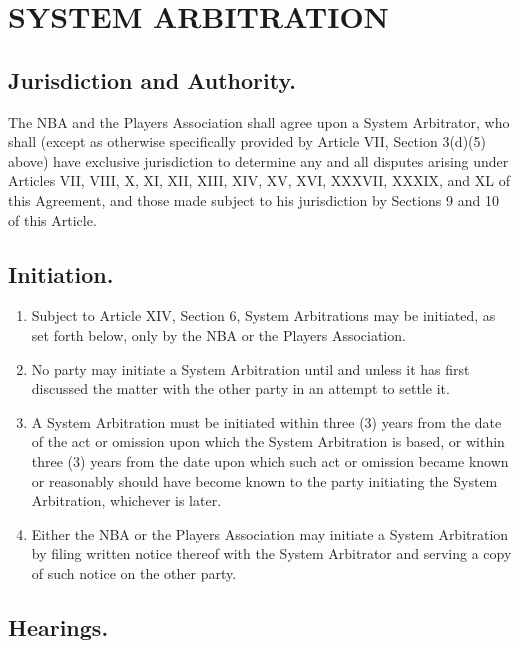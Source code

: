 \documentclass[
]{book}
\providecommand{\tightlist}{%
  \setlength{\itemsep}{0pt}\setlength{\parskip}{0pt}}
\begin{document}
\hypertarget{system-arbitration}{%
\chapter{SYSTEM ARBITRATION}\label{system-arbitration}}

\hypertarget{jurisdiction-and-authority.}{%
\section{Jurisdiction and Authority.}\label{jurisdiction-and-authority.}}

The NBA and the Players Association shall agree upon a System Arbitrator, who shall (except as otherwise specifically provided by Article VII, Section 3(d)(5) above) have exclusive jurisdiction to determine any and all disputes arising under Articles VII, VIII, X, XI, XII, XIII, XIV, XV, XVI, XXXVII, XXXIX, and XL of this Agreement, and those made subject to his jurisdiction by Sections 9 and 10 of this Article.

\hypertarget{initiation.-1}{%
\section{Initiation.}\label{initiation.-1}}

\begin{enumerate}
\def\labelenumi{(\alph{enumi})}
\tightlist
\item
  Subject to Article XIV, Section 6, System Arbitrations may be initiated, as set forth below, only by the NBA or the Players Association.
\item
  No party may initiate a System Arbitration until and unless it has first discussed the matter with the other party in an attempt to settle it.
\item
  A System Arbitration must be initiated within three (3) years from the date of the act or omission upon which the System Arbitration is based, or within three (3) years from the date upon which such act or omission became known or reasonably should have become known to the party initiating the System Arbitration, whichever is later.
\item
  Either the NBA or the Players Association may initiate a System Arbitration by filing written notice thereof with the System Arbitrator and serving a copy of such notice on the other party.
\end{enumerate}

\hypertarget{hearings.-1}{%
\section{Hearings.}\label{hearings.-1}}
\end{document}
